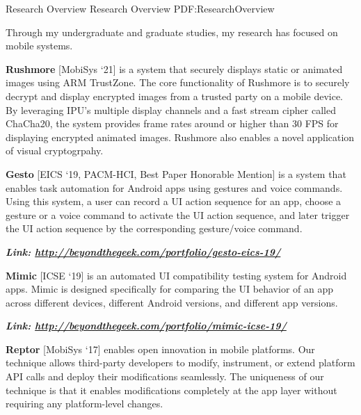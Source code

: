 \documentclass[letterpaper,MMMyyyy,nonstopmode]{simpleresumecv}
\begin{document}
\begin{Body}
\Section
{Research Overview}
{Research Overview}
{PDF:ResearchOverview}

\Entry
Through my undergraduate and graduate studies, my research has focused on mobile systems.

\Gap
\BulletItem
\textbf{Rushmore} [MobiSys `21] is a system that securely displays static or animated images 
using ARM TrustZone. The core functionality of Rushmore is to securely decrypt and display encrypted 
images from a trusted party on a mobile device. By leveraging IPU's multiple display channels and
a fast stream cipher called ChaCha20, the system provides frame rates around or higher than 30 FPS 
for displaying encrypted animated images. Rushmore also enables a novel application of visual 
cryptogrpahy.
\hfill

\vspace{0.5ex}
\Gap
\BulletItem
\textbf{Gesto} [EICS `19, PACM-HCI, Best Paper Honorable Mention] is a system that enables task 
automation for Android apps using gestures 
and voice commands. Using this system, a user can record a UI action sequence for an app, 
choose a gesture or a voice command to activate the UI action sequence, and later trigger 
the UI action sequence by the corresponding gesture/voice command.

\hspace{2ex}
\textbf{\textit{Link: \href{http://beyondthegeek.com/portfolio/gesto-eics-19/}
{http://beyondthegeek.com/portfolio/gesto-eics-19/}}}
\hfill

\vspace{0.5ex}
\Gap
\BulletItem
\textbf{Mimic} [ICSE `19] is an automated UI compatibility testing system for Android apps. 
Mimic is designed specifically for comparing the UI behavior of an app across different 
devices, different Android versions, and different app versions.

\hspace{2ex}
\textbf{\textit{Link: \href{http://beyondthegeek.com/portfolio/mimic-icse-19/}{http://beyondthegeek.com/portfolio/mimic-icse-19/}}}
\hfill

\vspace{0.5ex}
\Gap
\BulletItem
\textbf{Reptor} [MobiSys `17] enables open innovation in mobile platforms. Our technique allows third-party 
developers to modify, instrument, or extend platform API calls and deploy their modifications 
seamlessly. The uniqueness of our technique is that it enables modifications completely at 
the app layer without requiring any platform-level changes. 


\end{Body}
\end{document}

